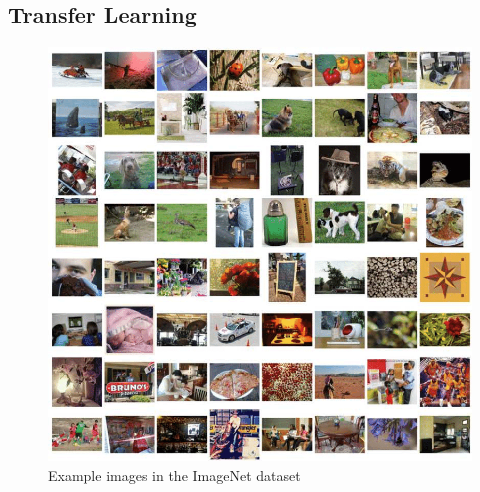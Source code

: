\documentclass{article}
\begin{document}
\subsection{Transfer Learning}
\begin{figure}[ht]
  \centering
  \includegraphics[scale=0.40]{Examples-in-the-ImageNet-dataset.png}
  \caption{Example images in the ImageNet dataset}
\end{figure}
\end{document}
